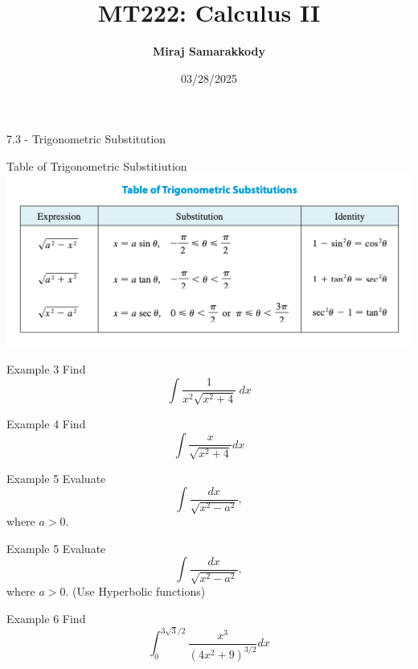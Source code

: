\documentclass{beamer}
\title{MT222: Calculus II}
\author{\textbf{Miraj Samarakkody}}
\institute{Tougaloo College}
\date{03/28/2025}
\begin{document}
\begin{frame}
    \titlepage
\end{frame}




\begin{frame}{}
    \begin{center}
        \Huge{7.3 - Trigonometric Substitution}
    \end{center}
    
\end{frame}



\begin{frame}{Table of Trigonometric Substitiution}
    \includegraphics[scale=0.6]{figures/fig_1.png}
\end{frame}


\begin{frame}{Example 3}
    Find \[\int \dfrac{1}{x^2 \sqrt{x^2+4}}~dx\]
\end{frame}

\begin{frame}{Example 4}
    Find \[\int \dfrac{x}{\sqrt{x^2+4}}dx\]
\end{frame}

\begin{frame}{Example 5}
    Evaluate \[\int \dfrac{dx}{\sqrt{x^2-a^2}},\] where \(a>0\).
    
\end{frame}

\begin{frame}{Example 5}
    Evaluate \[\int \dfrac{dx}{\sqrt{x^2-a^2}},\] where \(a>0\). (Use Hyperbolic functions)
    
\end{frame}

\begin{frame}{Example 6}
    Find \[\int_{0}^{3\sqrt{3}/2}\dfrac{x^3}{(4x^2+9)^{3/2}}dx\]
\end{frame}
\end{document}
